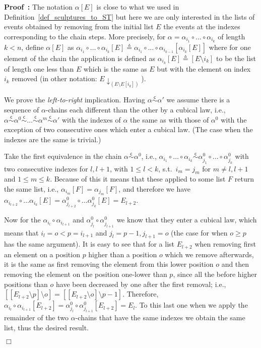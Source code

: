 \documentclass[submission,copyright,creativecommons]{eptcs}
\newenvironment{proof}[1][\!\!\,]{\vspace{1ex}\noindent\textbf{Proof #1: }}{\hfill$\Box$\vspace{2ex}}
\newcounter{case}
\newcommand\defequal{\ensuremath{\stackrel{\vartriangle}{=}}}
\newcommand\applyChainList[2]{\ensuremath{#1[#2]}}
\newcommand\chainEquivHDAsculpture{\ensuremath{\overset{\mathsf{c}}{\sim}}}
\begin{document}
\begin{proof}
The notation $\applyChainList{\alpha}{E}$ is close to what we used in Definition~\ref{def_sculptures_to_ST} but here we are only interested in the lists of events obtained by removing from the initial list $E$ the events at the indexes corresponding to the chain steps. More precisely, for $\alpha=\alpha_{i_{1}}\circ\dots\circ\alpha_{i_{k}}$ of length $k<n$, define $\applyChainList{\alpha}{E}$ as $\applyChainList{\alpha_{i_{1}}\circ\dots\circ\alpha_{i_{k}}}{E}\defequal\applyChainList{\alpha_{i_{1}}\circ\dots\circ\alpha_{i_{k-1}}}{\applyChainList{\alpha_{i_{k}}}{E}}$ where for one element of the chain the application is defined as $\applyChainList{\alpha_{i_{k}}}{E}\defequal [E\setminus i_{k}]$ to be the list of length one less than $E$ which is the same as $E$ but with the element on index $i_{k}$ removed (in other notation: $E\!\downarrow_{(E\setminus E[i_{k}])}$).

We prove the \textit{left-to-right} implication.
Having $\alpha\chainEquivHDAsculpture\alpha'$ we assume there is a sequence of $\alpha$-chains each different than the other by a cubical law, i.e., $\alpha\chainEquivHDAsculpture\alpha^{0}\chainEquivHDAsculpture\dots\chainEquivHDAsculpture\alpha^{m}\chainEquivHDAsculpture\alpha'$ with the indexes of $\alpha$ the same as with those of $\alpha^{0}$ with the exception of two consecutive ones which enter a cubical law.
(The case when the indexes are the same is trivial.)

Take the first equivalence in the chain $\alpha\chainEquivHDAsculpture\alpha^{0}$, i.e., $\alpha_{i_{1}}\circ\dots\circ\alpha_{i_{k}}\chainEquivHDAsculpture\alpha_{j_{1}}^{0}\circ\dots\circ\alpha_{j_{k}}^{0}$ with two consecutive indexes for $l,l+1$, with $1\leq l<k$, s.t.\ $i_{m}=j_{m}$ for $m\neq l,l+1$ and $1\leq m\leq k$. Because of this it means that these applied to some list $F$ return the same list, i.e., $\applyChainList{\alpha_{i_{m}}}{F}=\applyChainList{\alpha_{j_{m}}}{F}$, and therefore we have $\applyChainList{\alpha_{i_{l+2}}\circ\dots\alpha_{i_{k}}}{E}=\applyChainList{\alpha_{j_{l+2}}^{0}\circ\dots\alpha_{j_{k}}^{0}}{E}=E_{l+2}$.

Now for the $\alpha_{i_{l}}\circ\alpha_{i_{l+1}}$ and $\alpha_{j_{l}}^{0}\circ\alpha_{j_{l+1}}^{0}$ we know that they enter a cubical law, which means that $i_{l}=o<p=i_{l+1}$ and $j_{l}=p-1,j_{l+1}=o$ (the case for when $o\geq p$ has the same argument). It is easy to see that for a list $E_{l+2}$ when removing first an element on a position $p$ higher than a position $o$ which we remove afterwards, it is the same as first removing the element from this lower position $o$ and then removing the element on the position one-lower than $p$, since all the before higher positions than $o$ have been decreased by one after the first removal; i.e., $[[E_{l+2}\setminus p]\setminus o]=[[E_{l+2}\setminus o]\setminus p-1]$. Therefore, $\applyChainList{\alpha_{i_{l}}\circ\alpha_{i_{l+1}}}{E_{l+2}}=\applyChainList{\alpha_{j_{l}}^{0}\circ\alpha_{j_{l+1}}^{0}}{E_{l+2}}=E_{l}$. 
To this last one when we apply the remainder of the two $\alpha$-chains that have the same indexes we obtain the same list, thus the desired result.



\end{proof}
\end{document}
